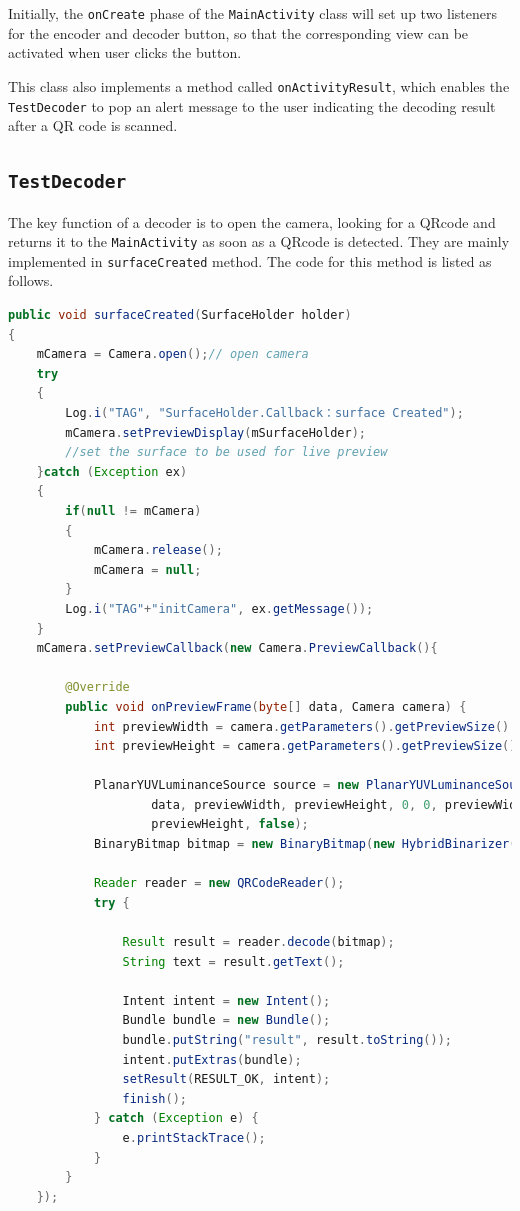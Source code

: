 Initially, the \texttt{onCreate} phase of the \texttt{MainActivity} class will set up two listeners for the encoder and decoder button, so that the corresponding view can be activated when user clicks the button. 

This class also implements a method called \texttt{onActivityResult}, which enables the \texttt{TestDecoder} to pop an alert message to the user indicating the decoding result after a QR code is scanned.

\subsection{\texttt{TestDecoder}}

The key function of a decoder is to open the camera, looking for a QRcode and returns it to the \texttt{MainActivity} as soon as a QRcode is detected. They are mainly implemented in \texttt{surfaceCreated} method. The code for this method is listed as follows.

\begin{lstlisting}[language=java]
public void surfaceCreated(SurfaceHolder holder)
{
    mCamera = Camera.open();// open camera
    try
    {
        Log.i("TAG", "SurfaceHolder.Callback：surface Created");
        mCamera.setPreviewDisplay(mSurfaceHolder);
        //set the surface to be used for live preview
    }catch (Exception ex)
    {
        if(null != mCamera)
        {
            mCamera.release();
            mCamera = null;
        }
        Log.i("TAG"+"initCamera", ex.getMessage());
    }
    mCamera.setPreviewCallback(new Camera.PreviewCallback(){

        @Override
        public void onPreviewFrame(byte[] data, Camera camera) {
            int previewWidth = camera.getParameters().getPreviewSize().width;
            int previewHeight = camera.getParameters().getPreviewSize().height;

            PlanarYUVLuminanceSource source = new PlanarYUVLuminanceSource(
                    data, previewWidth, previewHeight, 0, 0, previewWidth,
                    previewHeight, false);
            BinaryBitmap bitmap = new BinaryBitmap(new HybridBinarizer(source));

            Reader reader = new QRCodeReader();
            try {

                Result result = reader.decode(bitmap);
                String text = result.getText();

                Intent intent = new Intent();
                Bundle bundle = new Bundle();
                bundle.putString("result", result.toString());
                intent.putExtras(bundle);
                setResult(RESULT_OK, intent);
                finish();
            } catch (Exception e) {
                e.printStackTrace();
            }
        }
    });
\end{lstlisting}

